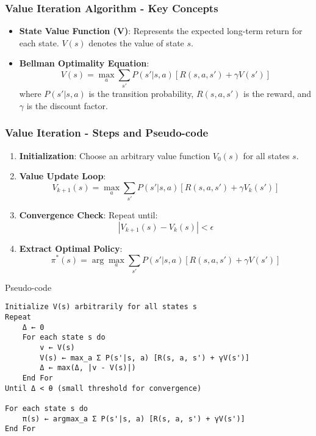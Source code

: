 \documentclass[aspectratio=169]{beamer}
\begin{document}
\begin{frame}[fragile]
    \frametitle{Value Iteration Algorithm - Key Concepts}
    \begin{itemize}
        \item \textbf{State Value Function (V)}: Represents the expected long-term return for each state. $V(s)$ denotes the value of state $s$.
        \item \textbf{Bellman Optimality Equation}: 
        \begin{equation}
            V(s) = \max_{a} \sum_{s'} P(s'|s, a) [R(s, a, s') + \gamma V(s')]
        \end{equation}
        where $P(s'|s, a)$ is the transition probability, $R(s, a, s')$ is the reward, and $\gamma$ is the discount factor.
    \end{itemize}
\end{frame}

\begin{frame}[fragile]
    \frametitle{Value Iteration - Steps and Pseudo-code}
    \begin{enumerate}
        \item \textbf{Initialization}: Choose an arbitrary value function $V_0(s)$ for all states $s$.
        \item \textbf{Value Update Loop}:
        \begin{equation}
            V_{k+1}(s) = \max_{a} \sum_{s'} P(s'|s, a) \left[ R(s, a, s') + \gamma V_k(s') \right]
        \end{equation}
        \item \textbf{Convergence Check}: Repeat until:
        \begin{equation}
            |V_{k+1}(s) - V_k(s)| < \epsilon
        \end{equation}
        \item \textbf{Extract Optimal Policy}:
        \begin{equation}
            \pi^*(s) = \arg\max_{a} \sum_{s'} P(s'|s, a) \left[ R(s, a, s') + \gamma V(s') \right]
        \end{equation}
    \end{enumerate}
    \begin{block}{Pseudo-code}
        \begin{lstlisting}
Initialize V(s) arbitrarily for all states s
Repeat
    Δ ← 0
    For each state s do
        v ← V(s)
        V(s) ← max_a Σ P(s'|s, a) [R(s, a, s') + γV(s')]
        Δ ← max(Δ, |v - V(s)|)
    End For
Until Δ < θ (small threshold for convergence)

For each state s do
    π(s) ← argmax_a Σ P(s'|s, a) [R(s, a, s') + γV(s')]
End For
        \end{lstlisting}
    \end{block}
\end{frame}
\end{document}
